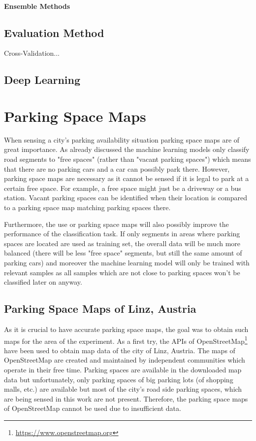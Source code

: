 \paragraph{Ensemble Methods}



\subsection{Evaluation Method}

Cross-Validation...


\subsection{Deep Learning}






\section{Parking Space Maps}

When sensing a city's parking availability situation parking space maps are of great importance. As already discussed the machine learning models only classify road segments to "free spaces" (rather than "vacant parking spaces") which means that there are no parking cars and a car can possibly park there. However, parking space maps are necessary as it cannot be sensed if it is legal to park at a certain free space. For example, a free space might just be a driveway or a bus station. Vacant parking spaces can be identified when their location is compared to a parking space map matching parking spaces there. 

Furthermore, the use or parking space maps will also possibly improve the performance of the classification task. If only segments in areas where parking spaces are located are used as training set, the overall data will be much more balanced (there will be less "free space" segments, but still the same amount of parking cars) and moreover the machine learning model will only be trained with relevant samples as all samples which are not close to parking spaces won't be classified later on anyway.

\subsection{Parking Space Maps of Linz, Austria}

As it is crucial to have accurate parking space maps, the goal was to obtain such maps for the area of the experiment. As a first try, the APIs of OpenStreetMap\footnote{\url{https://www.openstreetmap.org}} have been used to obtain map data of the city of Linz, Austria. The maps of OpenStreetMap are created and maintained by independent communities which operate in their free time. Parking spaces are available in the downloaded map data but unfortunately, only parking spaces of big parking lots (of shopping malls, etc.) are available but most of the city's road side parking spaces, which are being sensed in this work are not present. Therefore, the parking space maps of OpenStreetMap cannot be used due to insufficient data.

